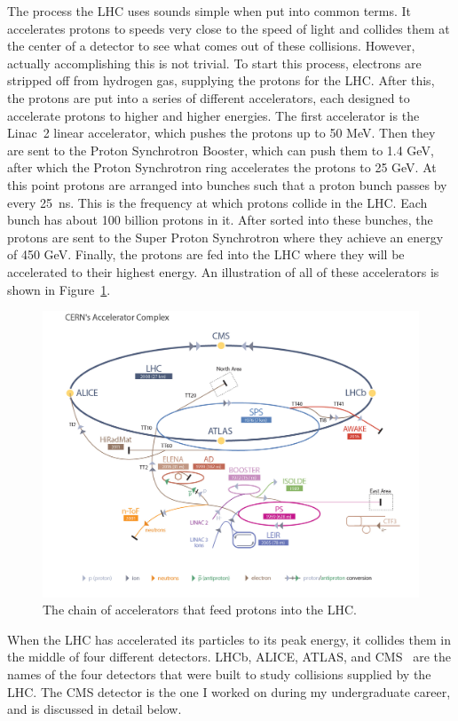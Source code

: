 The process the LHC uses sounds simple when put into common terms. It accelerates protons to speeds very close to the speed of light and collides them at the center of a detector to see what comes out of these collisions. However, actually accomplishing this is not trivial. To start this process, electrons are stripped off from hydrogen gas, supplying the protons for the LHC. After this, the protons are put into a series of different accelerators, each designed to accelerate protons to higher and higher energies. The first accelerator is the Linac~2 linear accelerator, which pushes the protons up to 50 MeV. Then they are sent to the Proton Synchrotron Booster, which can push them to 1.4 GeV, after which the Proton Synchrotron ring accelerates the protons to 25 GeV. At this point protons are arranged into bunches such that a proton bunch passes by every 25~ns. This is the frequency at which protons collide in the LHC. Each bunch has about 100 billion protons in it. After sorted into these bunches, the protons are sent to the Super Proton Synchrotron where they achieve an energy of 450 GeV. Finally, the protons are fed into the LHC where they will be accelerated to their highest energy. An illustration of all of these accelerators is shown in Figure~\ref{fig:acceleratorcomplex}.

\begin{figure}
\centering
\includegraphics[width=0.8\linewidth]{Figures/acceleratorcomplex.jpg}
\caption{The chain of accelerators that feed protons into the LHC.}
\label{fig:acceleratorcomplex}
\end{figure}

When the LHC has accelerated its particles to its peak energy, it collides them in the middle of four different detectors. LHCb, ALICE, ATLAS, and CMS~\cite{CMS} are the names of the four detectors that were built to study collisions supplied by the LHC. The CMS detector is the one I worked on during my undergraduate career, and is discussed in detail below.

